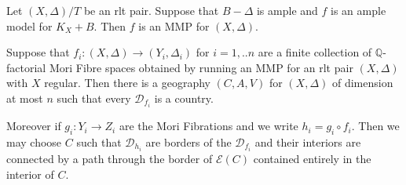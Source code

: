 	\begin{lemma}\cite[Lemma 3.6]{hacon2009sarkisov}\label{amp}
		Let $(X,\Delta)/T$ be an rlt pair. Suppose that $B-\Delta$ is ample and $f$ is an ample model for $K_{X}+B$. Then $f$ is an MMP for $(X,\Delta)$.
	\end{lemma}

\begin{lemma}\label{geo}
	Suppose that $f_{i}: (X,\Delta) \to (Y_{i},\Delta_{i})$ for $i=1,..n$ are a finite collection of $\mathbb{Q}$-factorial Mori Fibre spaces obtained by running an MMP for an rlt pair $(X,\Delta)$ with $X$ regular. Then there is a geography $(C,A,V)$ for $(X,\Delta)$ of dimension at most $n$ such that every $\mathcal{D}_{f_{i}}$ is a country. 
	
	Moreover if $g_{i}:Y_{i}\to Z_{i}$ are the Mori Fibrations and we write $h_{i}=g_{i}\circ f_{i}$. Then we may choose $C$ such that $\mathcal{D}_{h_{i}}$ are borders of the $\mathcal{D}_{f_{i}}$ and their interiors are connected by a path through the border of $\mathcal{E}(C)$ contained entirely in the interior of $C$.
\end{lemma}

